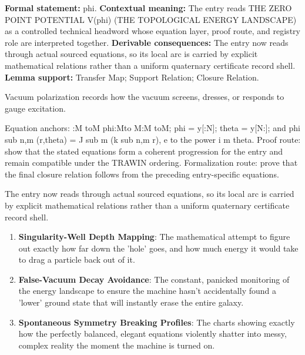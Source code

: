 \begingroup\footnotesize\setlength{\emergencystretch}{3em}\sloppy
\textbf{Formal statement:} phi. \textbf{Contextual meaning:} The entry reads THE ZERO POINT POTENTIAL V(phi) (THE TOPOLOGICAL ENERGY LANDSCAPE) as a controlled technical headword whose equation layer, proof route, and registry role are interpreted together. \textbf{Derivable consequences:} The entry now reads through actual sourced equations, so its local arc is carried by explicit mathematical relations rather than a uniform quaternary certificate record shell. \textbf{Lemma support:} Transfer Map; Support Relation; Closure Relation.\par
\endgroup

Vacuum polarization records how the vacuum screens, dresses, or responds to gauge excitation.

Equation anchors: :M toM phi:Mto M:M toM; phi = y[:N]; theta = y[N:]; and phi sub n,m (r,theta) = J sub m (k sub n,m r), e to the power i m theta. Proof route: show that the stated equations form a coherent progression for the entry and remain compatible under the TRAWIN ordering. Formalization route: prove that the final closure relation follows from the preceding entry-specific equations.

The entry now reads through actual sourced equations, so its local arc is carried by explicit mathematical relations rather than a uniform quaternary certificate record shell.
\endgroup

\begin{enumerate}[leftmargin=1.6em,itemsep=6pt,topsep=4pt]
\item \textbf{Singularity-Well Depth Mapping}: The mathematical attempt to figure out exactly how far down the 'hole' goes, and how much energy it would take to drag a particle back out of it.
\item \textbf{False-Vacuum Decay Avoidance}: The constant, panicked monitoring of the energy landscape to ensure the machine hasn't accidentally found a 'lower' ground state that will instantly erase the entire galaxy.
\item \textbf{Spontaneous Symmetry Breaking Profiles}: The charts showing exactly how the perfectly balanced, elegant equations violently shatter into messy, complex reality the moment the machine is turned on.
\end{enumerate}

